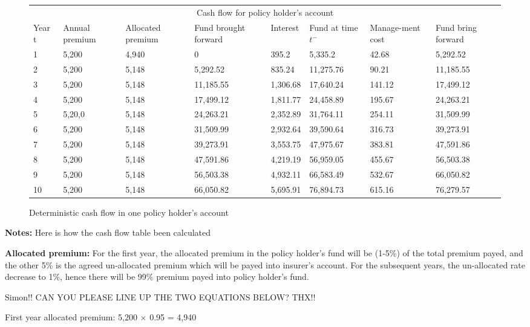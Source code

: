 \documentclass{report}
\begin{document}
\begin{figure}[H]
\begin{tabular}{p{1cm} p{1.5cm} p{1.5cm} p{2cm} p{1.5cm} p{2cm} p{1.5cm} p{1.5cm} }
\toprule
\multicolumn{8}{c}{Cash flow for policy holder's account} \\
\cmidrule(r){3-7}

Year t & Annual premium & Allocated premium & Fund brought forward & Interest & Fund at time $t^-$ & Manage-ment cost & Fund bring forward \\
\midrule
1	&5,200	&4,940	&0&	395.2	&5,335.2	&42.68	&5,292.52\\
2	&5,200	&5,148	&5,292.52	 &   835.24	&11,275.76 &	90.21	&11,185.55\\
3	&5,200	&5,148	&11,185.55&  1,306.68	&17,640.24	&141.12  &17,499.12\\
4&	5,200	&5,148	&17,499.12&  1,811.77&	24,458.89	&    195.67       &24,263.21\\
5&	5,20,0	&5,148&	24,263.21	&    2,352.89&	31,764.11	&   254.11	&31,509.99\\
6&	5,200	&5,148&	31,509.99	&   2,932.64&	39,590.64	&   316.73	&39,273.91\\
7&	5,200	&5,148&	39,273.91	&   3,553.75&	47,975.67	&   383.81	&47,591.86\\
8&	5,200	&5,148&	47,591.86	&   4,219.19&	56,959.05	&  455.67	    &56,503.38\\
9&	5,200	&5,148&	56,503.38	&   4,932.11&	66,583.49	&  532.67 	&66,050.82\\
10&	5,200	&5,148	&66,050.82	&5,695.91	&76,894.73	&615.16	&76,279.57\\
\bottomrule
\end{tabular}
\label{determ-PHcashflow}
\caption{Deterministic cash flow in one policy holder's account}
\end{figure}




\textbf{Notes:} Here is how the cash flow table been calculated

\textbf{Allocated premium:} For the first year, the allocated premium in the policy holder's fund will be (1-5\%) of the total premium payed, and the other 5\% is the agreed un-allocated premium which will be payed into insurer's account. For the subsequent years, the un-allocated rate decrease to 1\%, hence there will be 99\% premium payed into policy holder's fund.

Simon!! CAN YOU PLEASE LINE UP THE TWO EQUATIONS BELOW? THX!!


First year allocated premium:                5,200 $\times$ 0.95 = 4,940
\end{document}
